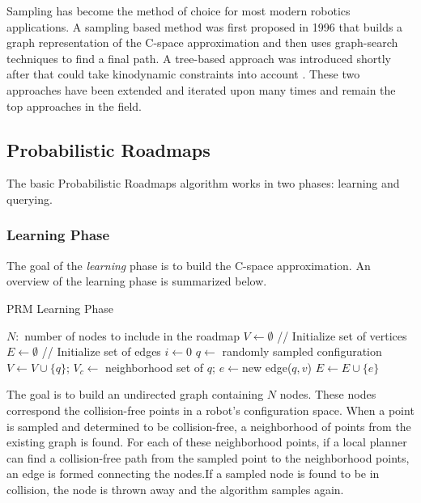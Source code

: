 \documentclass[10pt,conference]{ieeeconf}
\begin{document}
Sampling has become the method of choice for most modern robotics applications. A sampling based method was first proposed in 1996 \cite{PRM} that builds a graph representation of the C-space approximation and then uses graph-search techniques to find a final path. A tree-based approach was introduced shortly after that could take kinodynamic constraints into account \cite{RRT}. These two approaches have been extended and iterated upon many times and remain the top approaches in the field.

\subsection{Probabilistic Roadmaps}

The basic Probabilistic Roadmaps algorithm \cite{PRM} works in two phases: learning and querying. 

\subsubsection{Learning Phase}

The goal of the \emph{learning} phase is to build the C-space approximation. An overview of the learning phase is summarized below.

\begin{algorithm}
\caption{PRM Learning Phase}
\begin{algorithmic}[1]
\State $N: $ number of nodes to include in the roadmap
\State $V \leftarrow \emptyset$ // Initialize set of vertices
\State $E \leftarrow \emptyset$ // Initialize set of edges
\State $i \leftarrow 0$
\State $q \leftarrow $ randomly sampled configuration
	\State $V \leftarrow V \cup \{q\}$;
	\State $V_c \leftarrow $ neighborhood set of $q$;
			\State $e \leftarrow $new edge($q,v$)
			\State $E \leftarrow E \cup \{e\}$
		\EndIf
	\EndFor
\EndIf
\EndWhile
\end{algorithmic}
\end{algorithm}

The goal is to build an undirected graph containing $N$ nodes. These nodes correspond the collision-free points in a robot's configuration space. When a point is sampled and determined to be collision-free, a neighborhood of points from the existing graph is found. For each of these neighborhood points, if a local planner can find a collision-free path from the sampled point to the neighborhood points, an edge is formed connecting the nodes.If a sampled node is found to be in collision, the node is thrown away and the algorithm samples again. 
\end{document}
